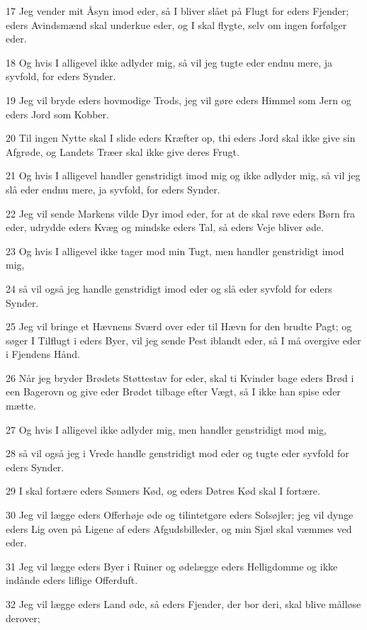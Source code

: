 \par 17 Jeg vender mit Åsyn imod eder, så I bliver slået på Flugt for eders Fjender; eders Avindsmænd skal underkue eder, og I skal flygte, selv om ingen forfølger eder.
\par 18 Og hvis I alligevel ikke adlyder mig, så vil jeg tugte eder endnu mere, ja syvfold, for eders Synder.
\par 19 Jeg vil bryde eders hovmodige Trods, jeg vil gøre eders Himmel som Jern og eders Jord som Kobber.
\par 20 Til ingen Nytte skal I slide eders Kræfter op, thi eders Jord skal ikke give sin Afgrøde, og Landets Træer skal ikke give deres Frugt.
\par 21 Og hvis I alligevel handler genstridigt imod mig og ikke adlyder mig, så vil jeg slå eder endnu mere, ja syvfold, for eders Synder.
\par 22 Jeg vil sende Markens vilde Dyr imod eder, for at de skal røve eders Børn fra eder, udrydde eders Kvæg og mindske eders Tal, så eders Veje bliver øde.
\par 23 Og hvis I alligevel ikke tager mod min Tugt, men handler genstridigt imod mig,
\par 24 så vil også jeg handle genstridigt imod eder og slå eder syvfold for eders Synder.
\par 25 Jeg vil bringe et Hævnens Sværd over eder til Hævn for den brudte Pagt; og søger I Tilflugt i eders Byer, vil jeg sende Pest iblandt eder, så I må overgive eder i Fjendens Hånd.
\par 26 Når jeg bryder Brødets Støttestav for eder, skal ti Kvinder bage eders Brød i een Bagerovn og give eder Brødet tilbage efter Vægt, så I ikke han spise eder mætte.
\par 27 Og hvis I alligevel ikke adlyder mig, men handler genstridigt mod mig,
\par 28 så vil også jeg i Vrede handle genstridigt mod eder og tugte eder syvfold for eders Synder.
\par 29 I skal fortære eders Sønners Kød, og eders Døtres Kød skal I fortære.
\par 30 Jeg vil lægge eders Offerhøje øde og tilintetgøre eders Solsøjler; jeg vil dynge eders Lig oven på Ligene af eders Afgudsbilleder, og min Sjæl skal væmmes ved eder.
\par 31 Jeg vil lægge eders Byer i Ruiner og ødelægge eders Helligdomme og ikke indånde eders liflige Offerduft.
\par 32 Jeg vil lægge eders Land øde, så eders Fjender, der bor deri, skal blive målløse derover;
